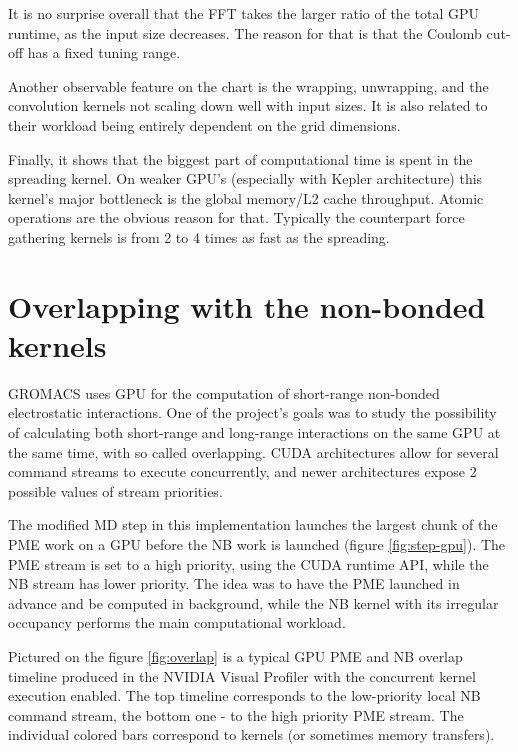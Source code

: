 \documentclass[12pt,a4paper]{report}
\newcommand{\draft}[1]{#1}
\begin{document}

It is no surprise overall that the FFT takes the larger ratio of the total GPU runtime, as the input size decreases. The reason for that is that the Coulomb cut-off has a fixed tuning range.

Another observable feature on the chart is the wrapping, unwrapping, and the convolution kernels not scaling down well with input sizes. It is also related to their workload being entirely dependent on the grid dimensions.

Finally, it shows that the biggest part of computational time is spent in the spreading kernel. On weaker GPU's (especially with Kepler architecture) this kernel's major bottleneck is the global memory/L2 cache throughput. Atomic operations are the obvious reason for that. Typically the counterpart force gathering kernels is from 2 to 4 times as fast as the spreading. 




\FloatBarrier
\section{Overlapping with the non-bonded kernels}\label{overlapped}

GROMACS uses GPU for the computation of short-range non-bonded electrostatic interactions. One of the project's goals was to study the possibility of calculating both short-range and long-range interactions on the same GPU at the same time, with so called overlapping. CUDA architectures allow for several command streams to execute concurrently, and newer architectures expose 2 possible values of stream priorities.

The modified MD step in this implementation launches the largest chunk of the PME work on a GPU before the NB work is launched (figure \ref{fig:step-gpu}). The PME stream is set to a high priority, using the CUDA runtime API, while the NB stream has lower priority. 
The idea was to have the PME launched in advance and be computed in background, while the NB kernel with its irregular occupancy performs the main computational workload.

Pictured on the figure \ref{fig:overlap} is a typical GPU PME and NB overlap timeline produced in the NVIDIA Visual Profiler with the concurrent kernel execution enabled.
The top timeline corresponds to the low-priority local NB command stream, the bottom one - to the high priority PME stream. The individual colored bars correspond to kernels (or sometimes memory transfers). 
\end{document}
